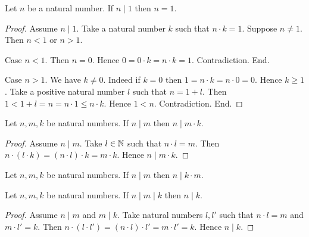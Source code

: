 \documentclass[10pt]{article}
\begin{document}
  \begin{forthel}
    \begin{proposition}[id=ARITHMETIC_07_6917446193643520,printid]
      Let $n$ be a natural number.
      If $n \mid 1$ then $n = 1$.
    \end{proposition}
    \begin{proof}
      Assume $n \mid 1$.
      Take a natural number $k$ such that $n \cdot k = 1$.
      Suppose $n \neq 1$.
      Then $n < 1$ or $n > 1$.

      Case $n < 1$.
        Then $n = 0$.
        Hence $0
          = 0 \cdot k
          = n \cdot k
          = 1$.
        Contradiction.
      End.

      Case $n > 1$.
        We have $k \neq 0$.
        Indeed if $k = 0$ then
        $1
          = n \cdot k
          = n \cdot 0
          = 0$.
        Hence $k \geq 1$.
        Take a positive natural number $l$ such that $n = 1 + l$.
        Then $1
          < 1 + l
          = n
          = n \cdot 1
          \leq n \cdot k$.
        Hence $1 < n$.
        Contradiction.
      End.
    \end{proof}
  \end{forthel}

  \begin{forthel}
    \begin{proposition}[id=ARITHMETIC_07_7463519983239168,printid]
      Let $n, m, k$ be natural numbers.
      If $n \mid m$ then $n \mid m \cdot k$.
    \end{proposition}
    \begin{proof}
      Assume $n \mid m$.
      Take $l \in \mathbb{N}$ such that $n \cdot l = m$.
      Then $n \cdot (l \cdot k)
        = (n \cdot l) \cdot k
        = m \cdot k$.
      Hence $n \mid m \cdot k$.
    \end{proof}
  \end{forthel}

  \begin{forthel}
    \begin{corollary}[id=ARITHMETIC_07_1588185794609152,printid]
      Let $n, m, k$ be natural numbers.
      If $n \mid m$ then $n \mid k \cdot m$.
    \end{corollary}
  \end{forthel}

  \begin{forthel}
    \begin{proposition}[id=ARITHMETIC_07_7863858316181504,printid]
      Let $n, m, k$ be natural numbers.
      If $n \mid m \mid k$ then $n \mid k$.
    \end{proposition}
    \begin{proof}
      Assume $n \mid m$ and $m \mid k$.
      Take natural numbers $l,l'$ such that $n \cdot l = m$ and $m \cdot l' = k$.
      Then $n \cdot (l \cdot l')
        = (n \cdot l) \cdot l'
        = m \cdot l'
        = k$.
      Hence $n \mid k$.
    \end{proof}
  \end{forthel}
\end{document}
